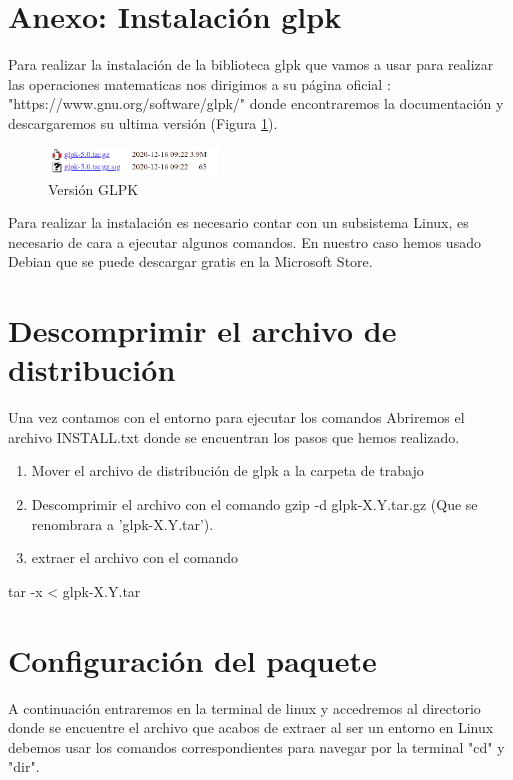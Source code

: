 \documentclass[11pt]{article}
\begin{document}
\section*{\textbf{Anexo: Instalación glpk}}

Para realizar la instalación de la biblioteca glpk que vamos a usar para realizar las operaciones matematicas nos dirigimos a su página oficial : "https://www.gnu.org/software/glpk/" donde encontraremos la documentación y descargaremos su ultima versión (Figura \ref{fig:version}).

\begin{figure}[h!] 
\centering
    \includegraphics[width=0.4\textwidth]{img/version.PNG}
\caption{Versión GLPK}
\label{fig:version}
\end{figure}

Para realizar la instalación es necesario contar con un subsistema Linux, es necesario de cara a ejecutar algunos comandos. En nuestro caso hemos usado Debian que se puede descargar gratis en la Microsoft Store.

\section*{Descomprimir el archivo de distribución}

Una vez contamos con el entorno para ejecutar los comandos Abriremos el archivo INSTALL.txt donde se encuentran los pasos que hemos realizado.

\begin{enumerate}[1.]
\item Mover el archivo de distribución de glpk a la carpeta de trabajo
\item Descomprimir el archivo con el comando gzip -d glpk-X.Y.tar.gz (Que se renombrara a 'glpk-X.Y.tar').
\item extraer el archivo con el comando
\end{enumerate}

\begin{center}tar -x < glpk-X.Y.tar \end{center}

\section*{Configuración del paquete}

A continuación entraremos en la terminal de linux y accedremos al directorio donde se encuentre el archivo que acabos de extraer al ser un entorno en Linux debemos usar los comandos correspondientes para navegar por la terminal "cd" y "dir".
\end{document}
